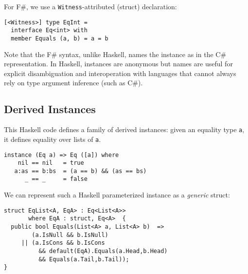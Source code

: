 \documentclass[preprint]{sig-alternate-05-2015}
\newif\ifclassic
\begin{document}
\ifclassic
For F\#, we introduce the shorter \lstinline{instance} declaration:

\lstset{language={FSharp}}
\begin{lstlisting}
instance Eq int where 
  Equals (a, b) = a = b
\end{lstlisting}

Note that the F\# syntax, like Haskell, elides the name of the instance in the more explicit C\# representation.
In Haskell, instances are anonymous.

\else
For F\#, we use a \lstinline{Witness}-attributed (struct) declaration:

\begin{lstlisting}
[<Witness>] type EqInt =
  interface Eq<int> with 
  member Equals (a, b) = a = b
\end{lstlisting}

Note that the F\# syntax, unlike Haskell, names the instance as in the  C\# representation.
In Haskell, instances are anonymous but names are useful for explicit disambiguation and interoperation with languages that cannot always rely on type argument inference (such as C\#).
\fi

\subsection{Derived Instances}

This Haskell code defines a family of derived instances: given an equality  type \lstinline{a}, it defines equality over lists of \lstinline{a}.
\begin{lstlisting}
instance (Eq a) => Eq ([a]) where 
    nil == nil   = true
   a:as == b:bs  = (a == b) && (as == bs)
      _ == _     = false
\end{lstlisting}


We can represent such a Haskell parameterized instance as a \emph{generic} struct:


\begin{lstlisting}
struct EqList<A, EqA> : Eq<List<A>>
       where EqA : struct, Eq<A>  {
  public bool Equals(List<A> a, List<A> b)  =>
        (a.IsNull && b.IsNull)
     || (a.IsCons && b.IsCons 
          && default(EqA).Equals(a.Head,b.Head) 
          && Equals(a.Tail,b.Tail));
}
\end{lstlisting}
\end{document}
